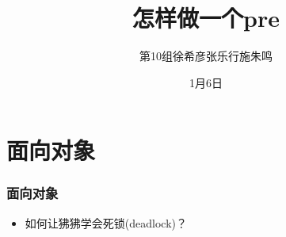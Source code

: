 \documentclass[AutoFakeBold]{beamer}
\title{怎样做一个pre}
\author{第10组\quad 徐希彦\quad 张乐行\quad 施朱鸣}
\date{1月6日}
\begin{document}
    {
    
    \begin{frame}
    \titlepage
    \end{frame}
    \section{面向对象}
    \begin{frame}
        \frametitle{面向对象}
    
        \begin{itemize}
            \item 如何让狒狒学会死锁(deadlock)？
        \end{itemize}
    
        \begin{figure}
            \centering
        \end{figure}
    \end{frame}

}
\end{document}
